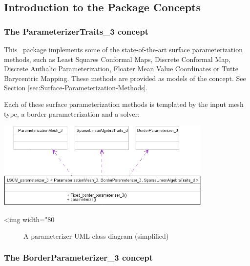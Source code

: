 \subsection{Introduction to the Package Concepts}

\subsubsection{The ParameterizerTraits\_3 concept}

This \cgal\ package implements some of the state-of-the-art
surface parameterization methods, such as Least Squares Conformal Maps,
Discrete Conformal Map, Discrete Authalic
Parameterization, Floater Mean Value Coordinates or Tutte Barycentric
Mapping. These methods are provided as models of the
 concept.
See Section \ref{sec:Surface-Parameterization-Methods}.

Each of these surface parameterization methods is templated by
the input mesh type, a border parameterization and a solver:

\begin{center}
    \label{Surface_mesh_parameterization-fig-parameterizer_class_diagram_simplified}
    \begin{ccTexOnly}
        \includegraphics[width=0.80\textwidth]{Surface_mesh_parameterization/parameterizer_class_diagram_simplified} %
    \end{ccTexOnly}
    \begin{ccHtmlOnly}
        <img width="80%
    \end{ccHtmlOnly}
    \begin{figure}[h]
        \caption{A parameterizer UML class diagram (simplified)}
    \end{figure}
\end{center}


\subsubsection{The BorderParameterizer\_3 concept}

